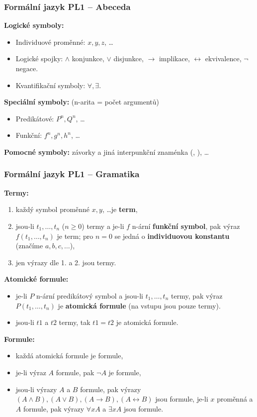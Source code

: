 \subsubsection{Formální jazyk PL1 -- Abeceda}
\textbf{Logické symboly:}
\begin{itemize}
\item Individuové proměnné: $x, y, z$, \ldots
\item Logické spojky:  $\land$ konjunkce, $\lor$ disjunkce, $ \rightarrow $ implikace,  $ \leftrightarrow $ ekvivalence, $ \lnot $ negace.
\item Kvantifikační symboly: $\forall, \exists$.
\end{itemize}

\noindent\textbf{Speciální symboly:} (n-arita = počet argumentů)
\begin{itemize}
\item Predikátové: $P^n, Q^n$, \ldots
\item Funkční: $f^n, g^n, h^n$, \ldots
\end{itemize}

\noindent\textbf{Pomocné symboly:} závorky a jiná interpunkční znaménka (, ), \ldots

\subsubsection{Formální jazyk PL1 -- Gramatika}
\textbf{Termy:}
\begin{enumerate}
\item každý symbol proměnné $x, y$, \ldots je \textbf{term},
\item jsou-li $ t_1, \ldots, t_n $ ($n \geq 0$) termy a je-li $f$ n-ární \textbf{funkční symbol}, pak výraz $f(t_1, \ldots, t_n)$ je term; pro $n = 0$ se jedná o \textbf{individuovou konstantu} (značíme $a, b, c, \ldots$),
\item jen výrazy dle 1. a 2. jsou termy.
\end{enumerate}

\noindent\textbf{Atomické formule:}
\begin{itemize}
\item je-li $ P $ n-ární predikátový symbol a jsou-li $ t_1, \ldots, t_n $ termy, pak výraz $ P(t_1, \ldots, t_n) $ je \textbf{atomická formule} (na vstupu jsou pouze termy).
\item jsou-li $t1$ a $t2$ termy, tak $t1 = t2$ je atomická formule.
\end{itemize}

\noindent\textbf{Formule:}
\begin{itemize}
\item každá atomická formule je formule,
\item je-li výraz $ A $ formule, pak $\neg A$ je formule,
\item jsou-li výrazy $A$ a $B$ formule, pak výrazy $(A \land B), (A \lor B), (A \rightarrow B), (A \leftrightarrow B)$ jsou formule, je-li $ x $ proměnná a $A$ formule, pak výrazy $\forall x A$ a $\exists x A$ jsou formule.
\end{itemize}

